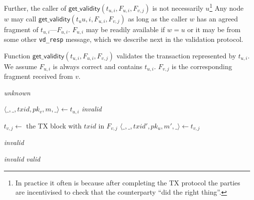 Further, the caller of $\textsf{get\_validity}(t_{u, i}, F_{u, i}, F_{v, j})$ is not necessarily 
$u$\footnote{In practice it often is because after completing the TX protocol the parties are incentivised to check that the counterparty ``did the right thing''.}
Any node $w$ may call $\textsf{get\_validity}(t_u{u, i}, F_{u, i}, F_{v, j})$ as long as the caller $w$ has an agreed fragment of $t_{u, i}$---$F_{u, i}$.
$F_{u, i}$ may be readily available if $w = u$ or it may be from some other \texttt{vd\_resp} message, which we describe next in the validation protocol.

\begin{algorithm}
\caption{Function $\textsf{get\_validity}(t_{u, i}, F_{u, i}, F_{v, j})$ validates the transaction represented by $t_{u, i}$.
We assume $F_{u, i}$ is always correct and contains $t_{u, i}$.
$F_{v, j}$ is the corresponding fragment received from $v$.}
\label{alg:get-validity}

\begin{algorithmic}[1]

        \State \Return \emph{unknown}
    \EndIf
    \State

    \label{line:valid-fragment}
    \State $\langle \_, \_, txid, pk_v, m, \_ \rangle \gets t_{u, i}$
        \State \Return \emph{invalid}
    \EndIf
    \State

    \State $t_{v, j} \gets $ the TX block with $txid$ in $F_{v, j}$
    \State $\langle \_, \_, txid', pk_u, m', \_ \rangle \gets t_{v, j}$ 

        \State \Return \emph{invalid}
    \EndIf
    \State

        \State \Return \emph{invalid}
    \EndIf
    \State \Return \emph{valid}
\end{algorithmic}
\end{algorithm}

